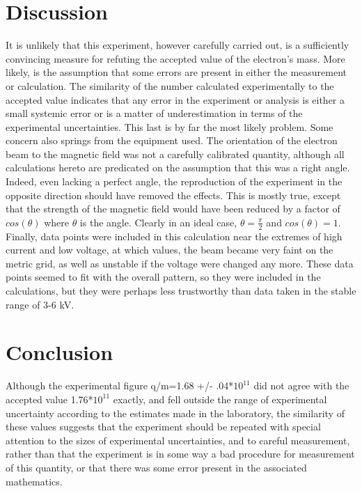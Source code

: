 \documentclass[aps,pre,twocolumn,nofootinbib]{revtex4}
\begin{document}
\section{Discussion}
It is unlikely that this experiment, however carefully carried out, is a sufficiently convincing measure for refuting the accepted value of the electron's mass.  More likely, is the assumption that some errors are present in either the measurement or calculation.  The similarity of the number calculated experimentally to the accepted value indicates that any error in the experiment or analysis is either a small systemic error or is a matter of underestimation in terms of the experimental uncertainties.  This last is by far the most likely problem.  Some concern also springs from the equipment used.  The orientation of the electron beam to the magnetic field was not a carefully calibrated quantity, although all calculations hereto are predicated on the assumption that this was a right angle.  Indeed, even lacking a perfect angle, the reproduction of the experiment in the opposite direction should have removed the effects.  This is mostly true, except that the strength of the magnetic field would have been reduced by a factor of $cos(\theta)$ where $\theta$ is the angle.  Clearly in an ideal case, $\theta=\frac{\pi}{2}$ and $cos(\theta)=1.$  Finally, data points were included in this calculation near the extremes of high current and low voltage, at which values, the beam became very faint on the metric grid, as well as unstable if the voltage were changed any more.  These data points seemed to fit with the overall pattern, so they were included in the calculations, but they were perhaps less trustworthy than data taken in the stable range of 3-6 kV.  

\section{Conclusion}
Although the experimental figure q/m=1.68 +/- .04*$10^{11}$ did not agree with the accepted value  1.76*$10^{11}$ exactly, and fell outside the range of experimental uncertainty according to the estimates made in the laboratory, the similarity of these values suggests that the experiment should be repeated with special attention to the sizes of experimental uncertainties, and to careful measurement, rather than that the experiment is in some way a bad procedure for measurement of this quantity, or that there was some error present in the associated mathematics.  

\appendix*
\end{document}
